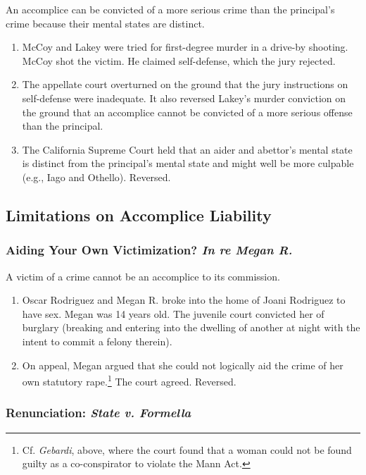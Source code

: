 An accomplice can be convicted of a more serious crime than the principal's 
crime because their mental states are distinct.

\begin{enumerate}
    \item McCoy and Lakey were tried for first-degree murder in a drive-by 
    shooting. McCoy shot the victim. He claimed self-defense, which the jury 
    rejected.
    \item The appellate court overturned on the ground that the jury 
    instructions on self-defense were inadequate. It also reversed Lakey's 
    murder conviction on the ground that an accomplice cannot be convicted of 
    a more serious offense than the principal.
    \item The California Supreme Court held that an aider and abettor's mental 
    state is distinct from the principal's mental state and might well be 
    more culpable (e.g., Iago and Othello). Reversed.
\end{enumerate}

\subsection{Limitations on Accomplice Liability}

\subsubsection{Aiding Your Own Victimization? \emph{In re Megan R.}}

A victim of a crime cannot be an accomplice to its commission.

\begin{enumerate}
    \item Oscar Rodriguez and Megan R. broke into the home of Joani Rodriguez 
    to have sex. Megan was 14 years old. The juvenile court convicted her of 
    burglary (breaking and entering into the dwelling of another at night with 
    the intent to commit a felony therein).
    \item On appeal, Megan argued that she could not logically aid the crime 
    of her own statutory rape.\footnote{Cf. \emph{Gebardi}, above, where the 
    court found that a woman could not be found guilty as a co-conspirator to 
    violate the Mann Act.} The court agreed. Reversed.
\end{enumerate}

\subsubsection{Renunciation: \emph{State v. Formella}}


